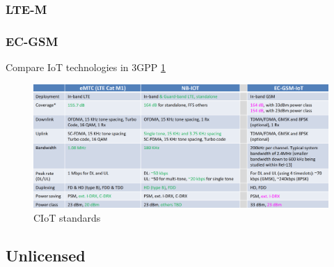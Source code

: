 \documentclass[conference]{IEEEtran}
\begin{document}
\subsubsection{LTE-M}
\label{sec:1-1-2}

\subsubsection{EC-GSM}
\label{sec:1-1-3}

Compare IoT technologies in 3GPP \ref{fig:3gpp_ciot}
\begin{figure}
    \centering
    \includegraphics[width=\linewidth]{Pictures/3GPP CIoT.png}
    \caption{CIoT standards}
    \label{fig:3gpp_ciot}
\end{figure}

\subsection{Unlicensed}
\label{sec:1-2}
\end{document}
